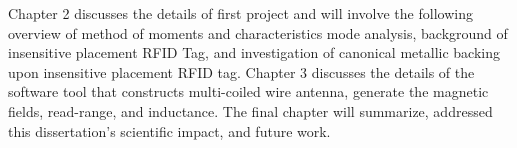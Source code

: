 Chapter 2 discusses the details of first project and will involve the following overview of method of moments and characteristics mode analysis, background of insensitive placement RFID Tag, and investigation of canonical metallic backing upon insensitive placement RFID tag.  Chapter 3 discusses the details of the software tool that constructs multi-coiled wire antenna, generate the  magnetic fields, read-range, and inductance. The final chapter will summarize, addressed this dissertation's scientific impact, and future work. 